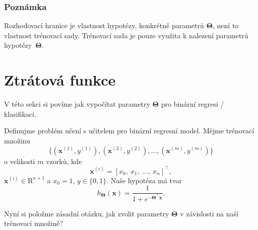 \subsubsection*{Poznámka}
\par{Rozhodovací hranice je vlastnost hypotézy, konkrétně parametrů $\bm{\Theta}$, není to vlastnost trénovací sady. Trénovací sada je pouze využita k nalezení parametrů hypotézy~$\bm{\Theta}$.}





\newpage















\section{Ztrátová funkce}
\label{sec:BinarniRegreseZtratovaFunkce}

\par{V této sekci si povíme jak vypočítat parametry $\bm{\Theta}$ pro binární regresi / klasifikaci.}

\par{Definujme problém učení s učitelem pro binární regresní model. Mějme trénovací množinu
\begin{equation}
	\{ \left( \bm{x}^{\left( 1 \right)}, y^{\left( 1 \right)} \right), \left( \bm{x}^{\left( 2 \right)}, y^{\left( 2 \right)} \right), \ldots , \left( \bm{x}^{\left( m \right)}, y^{\left( m \right)} \right) \}
\end{equation}
o velikosti $m$ vzorků, kde
\begin{equation}
	\bm{x}^{\left( i \right)} = \left[ x_0,~x_1,~\ldots,~x_n \right]^{\top},
\end{equation}
$\bm{x}^{\left( i \right)} \in \mathrm{R}^{n+1}$ a $x_0 = 1$, $y \in \{ 0,1 \}$. Naše hypotéza má tvar
\begin{equation}
	h_{\bm{\Theta}} \left( \bm{x} \right) = \frac{1}{1 + e^{-\bm{\Theta}^{\top} \bm{x}}}.
\end{equation}}

\par{Nyní si položme zásadní otázku, jak zvolit parametry $\bm{\Theta}$ v závislosti na naší trénovací množině?}

